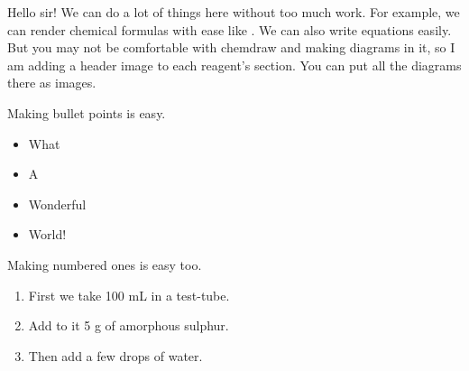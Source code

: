 Hello sir! We can do a lot of things here without too much work.
For example, we can render chemical formulas with ease like
. We can also write equations easily. But you may not be
comfortable with chemdraw and making diagrams in it, so I am adding
a header image to each reagent's section. You can put all the
diagrams there as images.

Making bullet points is easy.
\begin{itemize}
\item What
\item A
\item Wonderful
\item World!
\end{itemize}

Making numbered ones is easy too.
\begin{enumerate}
\item First we take 100 mL  in a test-tube.
\item Add to it 5 g of amorphous sulphur.
\item Then add a few drops of  water.
\end{enumerate}
